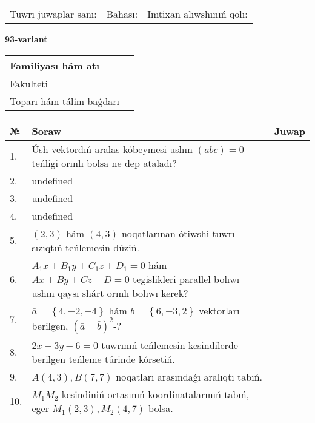 \documentclass{article}
\begin{document}
\vspace{0.7cm}

\begin{tabular}{lll}
Tuwrı juwaplar sanı: \underline{\hspace{1cm}} & 
Bahası: \underline{\hspace{1cm}} & 
Imtixan alıwshınıń qolı: \underline{\hspace{2cm}} \\
\end{tabular}

\egroup

\newpage


\textbf{93-variant}\\

\bgroup
\def\arraystretch{1.6} %

\begin{tabular}{|m{5.7cm}|m{9.5cm}|}
\hline
Familiyası hám atı & \\
\hline
Fakulteti  & \\
\hline
Toparı hám tálim baǵdarı  & \\
\hline
\end{tabular}

\vspace{0.7cm}

\begin{tabular}{|m{0.7cm}|m{10cm}|m{4cm}|}
\hline
№ & Soraw & Juwap \\
\hline
1. & Úsh vektordıń aralas kóbeymesi ushın \((abc) = 0\) teńligi orınlı bolsa ne dep ataladı? &  \\
\hline
2. & undefined &  \\
\hline
3. & undefined &  \\
\hline
4. & undefined &  \\
\hline
5. & $(2, 3)$ hám $(4, 3)$ noqatlarınan ótiwshi tuwrı sızıqtıń teńlemesin dúziń. &  \\
\hline
6. & \(A_{1}x + B_{1}y + C_{1}z + D_{1} = 0\) hám \(Ax + By + Cz + D = 0\) tegislikleri parallel bolıwı ushın qaysı shárt orınlı bolıwı kerek? &  \\
\hline
7. & \(\bar{a} = \left\{ 4,- 2,- 4 \right\}\) hám \(\bar{b} = \left\{ 6,- 3, 2 \right\}\) vektorları berilgen, \((\bar{a} - \bar{b}) ^{2}\)-? &  \\
\hline
8. & \(2 x + 3 y - 6 = 0\) tuwrınıń teńlemesin kesindilerde berilgen teńleme túrinde kórsetiń. &  \\
\hline
9. & \(A (4, 3), B (7, 7)\) noqatları arasındaǵı aralıqtı tabıń. &  \\
\hline
10. & \(M_{1}M_{2}\) kesindiniń ortasınıń koordinatalarınıń tabıń, eger \(M_{1} (2, 3), M_{2} (4, 7)\) bolsa. & \\
\hline
\end{tabular}
\end{document}
